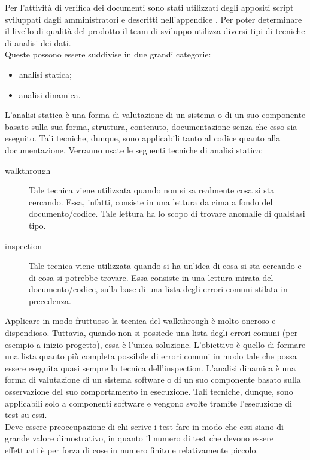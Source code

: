 	
	Per l'attività di verifica dei documenti sono stati utilizzati degli appositi script sviluppati dagli amministratori e descritti nell'appendice .
			Per poter determinare il livello di qualità del prodotto il team di sviluppo utilizza diversi tipi di tecniche di analisi dei dati.\\
			Queste possono essere suddivise in due grandi categorie:
			\begin{itemize}
				\item analisi statica;
				\item analisi dinamica.
			\end{itemize}
				L'analisi statica è una forma di valutazione di un sistema o di un suo componente basato sulla sua forma, struttura, contenuto, documentazione senza che esso sia eseguito. Tali tecniche, dunque, sono applicabili tanto al codice quanto alla documentazione.
				Verranno usate le seguenti tecniche di analisi statica:
				\begin{description}
					\item[walkthrough] Tale tecnica viene utilizzata quando non si sa realmente cosa si sta cercando. Essa, infatti, consiste in una lettura da cima a fondo del documento/codice. Tale lettura ha lo scopo di trovare anomalie di qualsiasi tipo.
					\item[inspection] Tale tecnica viene utilizzata quando si ha un'idea di cosa si sta cercando e di cosa si potrebbe trovare. Essa consiste in una lettura mirata del documento/codice, sulla base di una lista degli errori comuni stilata in precedenza.
				\end{description}
				Applicare in modo fruttuoso la tecnica del walkthrough è molto oneroso e dispendioso. Tuttavia, quando non si possiede una lista degli	errori comuni (per esempio a inizio progetto), essa è l'unica soluzione. L'obiettivo è quello di formare una lista quanto più completa possibile di errori comuni in modo tale che possa essere eseguita quasi sempre la tecnica dell'inspection.
				L'analisi dinamica è una forma di valutazione di un sistema software o di un suo componente basato sulla osservazione del suo comportamento in esecuzione. Tali tecniche, dunque, sono applicabili solo a componenti software e vengono svolte tramite l'esecuzione di test su essi.\\
				Deve essere preoccupazione di chi scrive i test fare in modo che essi siano di grande valore dimostrativo, in quanto il numero di test che devono essere effettuati è per forza di cose in numero finito e relativamente piccolo.
